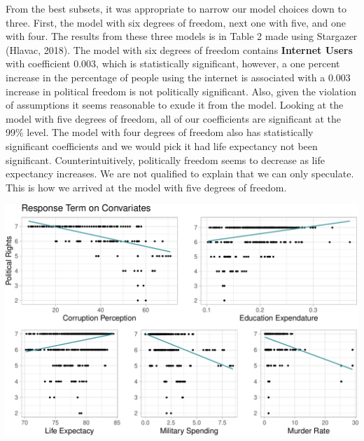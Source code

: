 \documentclass[
  english,
  man,floatsintext]{apa6}
\begin{document}
From the best subsets, it was appropriate to narrow our model choices down to three. First, the model with six degrees of freedom, next one with five, and one with four. The results from these three models is in Table 2 made using Stargazer (Hlavac, 2018). The model with six degrees of freedom contains \textbf{Internet Users} with coefficient 0.003, which is statistically significant, however, a one percent increase in the percentage of people using the internet is associated with a 0.003 increase in political freedom is not politically significant. Also, given the violation of assumptions it seems reasonable to exude it from the model. Looking at the model with five degrees of freedom, all of our coefficients are significant at the 99\% level. The model with four degrees of freedom also has statistically significant coefficients and we would pick it had life expectancy not been significant. Counterintuitively, politically freedom seems to decrease as life expectancy increases. We are not qualified to explain that we can only speculate. This is how we arrived at the model with five degrees of freedom.

\includegraphics{paper_files/figure-latex/unnamed-chunk-5-1.pdf}
\end{document}
